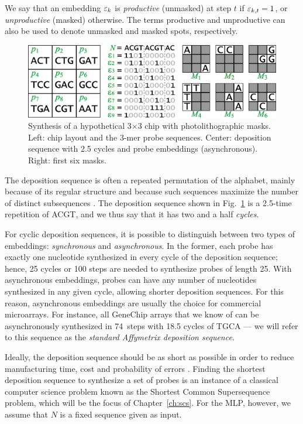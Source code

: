 We say that an embedding $\varepsilon_k$ is \emph{productive} (unmasked) at step $t$ if
$\varepsilon_{k,t} = 1$, or \emph{unproductive} (masked) otherwise. The terms
productive and unproductive can also be used to denote unmasked and masked
spots, respectively.

\begin{figure}
\centerline{\includegraphics[width=\textwidth]{figures/chip.eps}}
\caption{Synthesis of a hypothetical 3$\times$3 chip with photolithographic
  masks. Left: chip layout and the 3-mer probe sequences. Center: deposition
  sequence with 2.5 cycles and probe embeddings (asynchronous). Right: first six
  masks.}
\label{fig:masking_process}
\end{figure}

The deposition sequence is often a repeated permutation of the alphabet, mainly
because of its regular structure and because such sequences maximize the number
of distinct subsequences \citep{Chase1976}. The deposition sequence shown in
Fig.~\ref{fig:masking_process} is a 2.5-time repetition of ACGT, and we thus say
that it has two and a half \emph{cycles}.

For cyclic deposition sequences, it is possible to distinguish between two types
of embeddings: \emph{synchronous} and \emph{asynchronous}. In the former, each
probe has exactly one nucleotide synthesized in every cycle of the deposition
sequence; hence, 25 cycles or 100 steps are needed to synthesize probes of
length 25. With asynchronous embeddings, probes can have any number of
nucleotides synthesized in any given cycle, allowing shorter deposition
sequences. For this reason, asynchronous embeddings are usually the choice for
commercial microarrays.  For instance, all GeneChip arrays that we know of can
be asynchronously synthesized in 74~steps with 18.5 cycles of TGCA --- we will
refer to this sequence as the \emph{standard Affymetrix deposition sequence}.

Ideally, the deposition sequence should be as short as possible in order to
reduce manufacturing time, cost and probability of errors \citep{Rahmann2003}.
Finding the shortest deposition sequence to synthesize a set of probes is an
instance of a classical computer science problem known as the Shortest Common
Supersequence problem, which will be the focus of Chapter~\ref{ch:scs}. For the
MLP, however, we assume that $N$ is a fixed sequence given as input.

